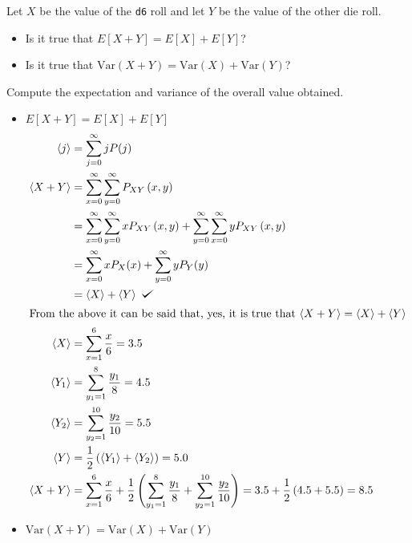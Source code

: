 \message{ !name(1-recurrence.tex)}\documentclass[addpoints]{exam}
\def\checkmark{\tikz\fill[scale=0.4](0,.35) -- (.25,0) -- (1,.7) -- (.25,.15) -- cycle;}
\newcommand{\Exval}[1]{\left< #1\right>}
\newcommand{\var}{\text{Var}}
\begin{document}
\begin{questions}
\begin{parts}
  Let $X$ be the value of the \texttt{d6} roll and let $Y$ be the value of the
  other die roll. 
  \begin{itemize}
  \item Is it true that $E[X + Y] = E[X] + E[Y]$?
  \item Is it true that $\var(X + Y) = \var(X) + \var(Y)$? 
  \end{itemize}
  Compute the expectation and variance of the overall value obtained.
\begin{solution}
\begin{itemize}
\item {}$E[X + Y] = E[X] + E[Y]$
\begin{align*}
\left< j\right> &= \sum_{j=0}^{\infty}jP(j)\\
\left< X+Y\right> &= \sum_{x=0}^{\infty}\sum_{y=0}^{\infty}P_{XY}\left( x,y\right)\\
                  &= \sum_{x=0}^{\infty}\sum_{y=0}^{\infty}xP_{XY}\left( x,y\right) + \sum_{y=0}^{\infty}\sum_{x=0}^{\infty}yP_{XY}\left( x,y\right)\\
                  &= \sum_{x=0}^{\infty}xP_{X}(x) + \sum_{y=0}^{\infty}yP_{Y}(y)\\
                  &= \left< X\right> + \left< Y\right>\ \checkmark\\
\intertext{From the above it can be said that, yes, it is true that $\Exval{X+Y} = \Exval{X} + \Exval{Y}$}
\left< X\right> &= \sum_{x=1}^{6}\frac{x}{6} = 3.5\\
\left< Y_{1}\right> &= \sum_{y_{1}=1}^{8}\frac{y_{1}}{8} = 4.5\\
\left< Y_{2}\right> &= \sum_{y_{2}=1}^{10}\frac{y_{2}}{10} = 5.5\\
\left< Y\right> &= \frac{1}{2}\left( \left< Y_{1}\right> + \left< Y_{2}\right>\right) = 5.0\\
\left< X+Y\right> &= \sum_{x=1}^{6}\frac{x}{6} + \frac{1}{2}\left( \sum_{y_{1}=1}^{8}\frac{y_{1}}{8} + \sum_{y_{2}=1}^{10}\frac{y_{2}}{10}\right) = 3.5 + \frac{1}{2}\left(4.5 + 5.5\right) = 8.5\\
\end{align*}
\end{itemize}
\end{solution} 
\begin{solution}
\begin{itemize}
\item {}$\var (X + Y) = \var (X) + \var (Y)$

\end{itemize}
\end{solution}
\end{parts}
\end{questions}
\end{document}
